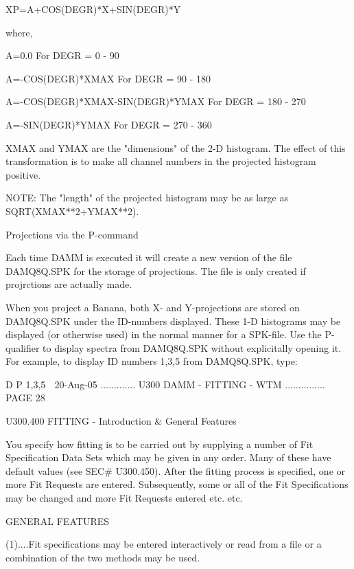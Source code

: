          XP=A+COS(DEGR)*X+SIN(DEGR)*Y
 
         where,
 
         A=0.0                               For DEGR =   0 -  90
 
         A=-COS(DEGR)*XMAX                   For DEGR =  90 - 180
 
         A=-COS(DEGR)*XMAX-SIN(DEGR)*YMAX    For DEGR = 180 - 270
 
         A=-SIN(DEGR)*YMAX                   For DEGR = 270 - 360
 
 
   XMAX  and  YMAX  are  the  "dimensions" of the 2-D histogram. The effect of
   this transformation is  to  make  all  channel  numbers  in  the  projected
   histogram positive.
 
   NOTE:  The  "length"  of  the  projected  histogram  may  be  as  large  as
          SQRT(XMAX**2+YMAX**2).
 
   Projections via the P-command
 
   Each time DAMM is executed it  will  create  a  new  version  of  the  file
   DAMQ8Q.SPK  for  the  storage  of  projections. The file is only created if
   projrctions are actually made.
 
   When you project  a  Banana,  both  X-  and  Y-projections  are  stored  on
   DAMQ8Q.SPK  under  the  ID-numbers  displayed.  These 1-D histograms may be
   displayed (or otherwise used) in the normal manner for a SPK-file. Use  the
   P-qualifier  to  display  spectra  from  DAMQ8Q.SPK  without   explicitally
   opening it. For example, to display ID numbers 1,3,5 from DAMQ8Q.SPK, type:
 
   D P 1,3,5
    
   20-Aug-05 ............. U300  DAMM - FITTING - WTM ............... PAGE  28
 
   U300.400  FITTING - Introduction & General Features
 
   You  specify  how fitting is to be carried out by supplying a number of Fit
   Specification Data Sets which may be given in  any  order.  Many  of  these
   have  default  values  (see  SEC#  U300.450).  After the fitting process is
   specified, one or more Fit Requests are entered. Subsequently, some or  all
   of  the  Fit  Specifications  may  be changed and more Fit Requests entered
   etc. etc.
 
                                GENERAL FEATURES
 
   (1)....Fit specifications may be entered interactively or read from a  file
          or a combination of the two methods may be used.
 
